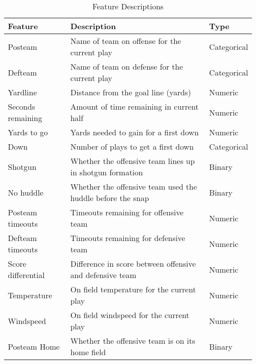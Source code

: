 \documentclass[11pt]{article}
\begin{document}
        

        
            \begin{table*}[ht]
            \caption{Feature Descriptions} \label{tab:title} 
            \centering
            \begin{tabular}{|| m{4cm} | m{10cm}| m{2cm} ||} 
                \hline
                \textbf{Feature} & \textbf{Description} & \textbf{Type}  \\
                \hline\hline
                Posteam  & Name of team on offense for the current play & Categorical \\
                \hline 
                Defteam & Name of team on defense for the current play & Categorical \\ 
                \hline
                Yardline  & Distance from the goal line (yards) & Numeric \\
                \hline 
                Seconds remaining & Amount of time remaining in current half & Numeric \\
                \hline
                Yards to go & Yards needed to gain for a first down & Numeric \\
                \hline 
                Down & Number of plays to get a first down & Categorical \\
                \hline 
                Shotgun & Whether the offensive team lines up in shotgun formation & Binary \\
                \hline
                No huddle & Whether the offensive team used the huddle before the snap & Binary \\
                \hline 
                Posteam timeouts & Timeouts remaining for offensive team & Numeric \\
                \hline
                Defteam timeouts & Timeouts remaining for defensive team & Numeric \\
                \hline 
                Score differential & Difference in score between offensive and defensive team & Numeric \\
                \hline
                Temperature & On field temperature for the current play & Numeric \\
                \hline 
                Windspeed & On field windspeed for the current play & Numeric \\
                \hline 
                Posteam Home & Whether the offensive team is on its home field & Binary \\
                \hline 

\end{tabular}
\end{table*}
\end{document}
